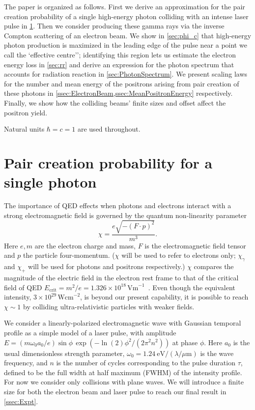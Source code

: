 \documentclass[reprint,superscriptaddress,amsmath,amssymb,aps,pra]{revtex4-1}
\newcommand{\micron}{{\mu\mathrm{m}}}
\newcommand{\Wcm}{\mathrm{Wcm}}
\newcommand{\eV}{\mathrm{eV}}
\newcommand{\lnTwo}{\ln(2)}
\begin{document}
The paper is organized as follows. First we derive an approximation for
the pair creation probability of a single high-energy photon colliding
with an intense laser pulse in \cref{ssec:PhotonBeam}. Then we consider
producing these gamma rays via the inverse Compton scattering of an electron
beam. We show in \cref{sec:phi_c} that high-energy photon production is
maximized in the leading edge of the pulse near a point we call the
`effective centre''; identifying this region lets us estimate the
electron energy loss in \cref{sec:rr} and derive an expression for the
photon spectrum that accounts for radiation reaction in \cref{sec:PhotonSpectrum}.
We present scaling laws for the number and mean energy of the positrons
arising from pair creation of these photons in
\cref{ssec:ElectronBeam,ssec:MeanPositronEnergy} respectively. Finally, we
show how the colliding beams' finite sizes and offset affect the positron yield.

Natural units $\hbar = c = 1$ are used throughout.

\section{Pair creation probability for a single photon}
\label{ssec:PhotonBeam}

The importance of QED effects when photons and electrons interact with a
strong electromagnetic field is governed by the
quantum non-linearity parameter~\cite{Erber,Ritus,BKS}
	\begin{equation}
	\chi = \frac{e \sqrt{-(F\cdot p)^2}}{m^3}.
	\label{eq:ChiDef}
	\end{equation}
Here $e,m$ are the electron charge and mass, $F$ is the electromagnetic
field tensor and $p$ the particle four-momentum.
($\chi$ will be used to refer to electrons only; $\chi_\gamma$ and $\chi_+$
will be used for photons and positrons respectively.)
$\chi$ compares the magnitude of the electric field in the electron rest
frame to that of the critical field of QED
$E_\text{crit} = m^2/e = 1.326\times10^{18}\,\text{Vm}^{-1}$~\cite{Heisenberg}.
Even though the equivalent intensity, $3\times10^{29}\,\Wcm^{-2}$, is beyond
our present capability, it is possible to reach $\chi \sim 1$
by colliding ultra-relativistic particles with weaker fields.

We consider a linearly-polarized electromagnetic wave with Gaussian temporal
profile as a simple model of a laser pulse, with amplitude 
$E = (m \omega_0 a_0/e) \sin\phi\,\exp(-\lnTwo \phi^2/(2 \pi^2 n^2))$
at phase $\phi$.
Here $a_0$ is the usual dimensionless strength parameter,
$\omega_0 = 1.24~\eV/(\lambda/\micron)$ is the wave frequency,
and $n$ is the number of cycles corresponding to the pulse duration $\tau$,
defined to be the full width at half maximum (FWHM) of the intensity profile.
For now we consider only collisions with plane waves. We will introduce
a finite size for both the electron beam and laser pulse to reach
our final result in \cref{ssec:Expt}.
\end{document}
